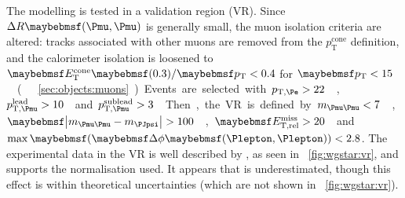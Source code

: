 The \Wgstar modelling is tested in a \HepProcess{\Wgstar \HepTo \Pe\Pnu\Pmu\Pmu} validation 
region (VR). Since $\Delta R\parenths{\Pmu,\Pmu}$ is generally small, the muon isolation 
criteria are altered: tracks associated with other muons are removed from the 
$p_{\text{T}}^{\text{cone}}$ definition, and the calorimeter isolation is loosened to 
$\etcone{0.3}/\pt < 0.4$ for \unit{$\pt < 15$}{\GeV} (\cf \Section~\ref{sec:objects:muons}).
Events are selected with \unit{$p_{\text{T,\Pe}} > 22$}{\GeV}, 
\unit{$p_{\text{T,\Pmu}}^{\text{lead}} > 10$}{\GeV} and 
\unit{$p_{\text{T,\Pmu}}^{\text{sublead}} > 3$}{\GeV}. 
Then, the VR is defined by \unit{$m_{\HepProcess{\Pmu\Pmu}} < 7$}{\GeV}, 
\unit{$\mods{m_{\HepProcess{\Pmu\Pmu}} - m_{\PJpsi}} > 100$}{\MeV}, 
\unit{$\calometrel > 20$}{\GeV} and $\max\parenths{\dphill} < 2.8$.
The experimental data in the VR is well described by \sherpa, as seen in 
\Figure~\ref{fig:wgstar:vr}, and supports the normalisation used. It appears that \njets is 
underestimated, though this effect is within theoretical uncertainties (which are not shown 
in \Figure~\ref{fig:wgstar:vr}).

